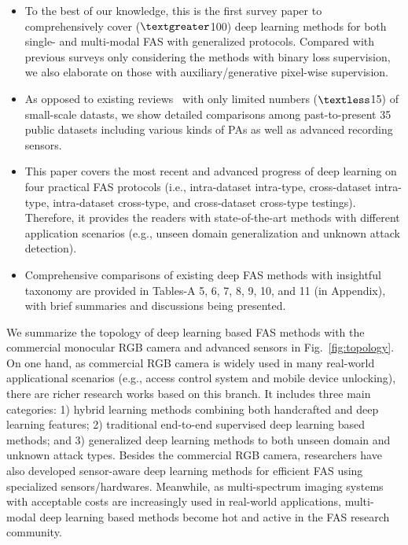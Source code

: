 \documentclass[10pt,journal,compsoc]{IEEEtran}
\begin{document}
\begin{itemize}
    
    \item To the best of our knowledge, this is the first survey paper to comprehensively cover ($\textgreater$100) deep learning methods for both single- and multi-modal FAS with generalized protocols. Compared with previous surveys only considering the methods with binary loss supervision, we also elaborate on those with auxiliary/generative pixel-wise supervision. 
    
    \item  As opposed to existing reviews~\cite{pereira2020rise,jia2020survey,el2020deep} with only limited numbers ($\textless$15) of small-scale datasts, we show detailed comparisons among past-to-present 35 public datasets including various kinds of PAs as well as advanced recording sensors.
    
   \item  This paper covers the most recent and advanced progress of deep learning on four practical FAS protocols (i.e., intra-dataset intra-type, cross-dataset intra-type, intra-dataset cross-type, and cross-dataset cross-type testings). Therefore, it provides the readers with state-of-the-art methods with different application scenarios (e.g., unseen domain generalization and unknown attack detection).
   
   \item  Comprehensive comparisons of existing deep FAS methods with insightful taxonomy are provided in Tables-A 5, 6, 7, 8, 9, 10, and 11 (in Appendix), with brief summaries and discussions being presented.
 
\end{itemize}



We summarize the topology of deep learning based FAS methods with the commercial monocular RGB camera and advanced sensors in Fig.~\ref{fig:topology}. On one hand, as commercial RGB camera is widely used in many real-world applicational scenarios (e.g., access control system and mobile device unlocking), there are richer research works based on this branch. It includes three main categories: 1) hybrid learning methods combining both handcrafted and deep learning features; 2) traditional end-to-end supervised deep learning based methods; and 3) generalized deep learning methods to both unseen domain and unknown attack types. 
Besides the commercial RGB camera, researchers have also developed sensor-aware deep learning methods for efficient FAS using specialized sensors/hardwares.
Meanwhile, as multi-spectrum imaging systems with acceptable costs are increasingly used in real-world applications, multi-modal deep learning based methods become hot and active in the FAS research community. 
\end{document}

